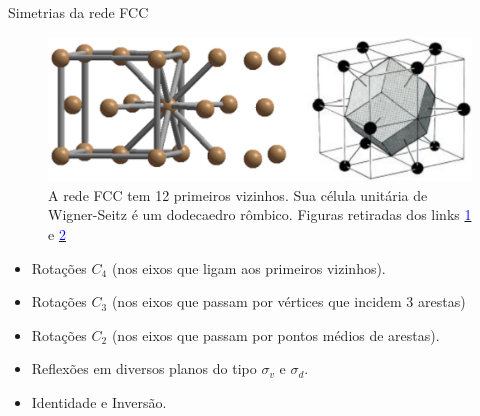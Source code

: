 \documentclass[aspectratio=169]{beamer}
\begin{document}


\begin{frame}{Simetrias da rede FCC}

\begin{figure}[H]
\centering
\includegraphics[width=0.7\linewidth]{fig/fcc_wignerseitz.png}
\caption{A rede FCC tem 12 primeiros vizinhos. Sua célula unitária de Wigner-Seitz é um dodecaedro rômbico. Figuras retiradas dos links \href{https://www.toppr.com/ask/question/the-coordination-number-of-an-atom-in-a-fcc-lattice-is/}{\textcolor{blue}{1}} e \href{https://www.chegg.com/homework-help/questions-and-answers/problem-1-7-points-bcc-fcc-lattices-others-reciprocal-latices-means-example-x-ray-diffract-q35699379}{\textcolor{blue}{2}}}
\label{fig:fcc_wignerseitz}
\end{figure}

\begin{itemize}
\item Rotações $C_4$ (nos eixos que ligam aos primeiros vizinhos).
\item Rotações $C_3$ (nos eixos que passam por vértices que incidem 3 arestas)
\item Rotações $C_2$ (nos eixos que passam por pontos médios de arestas).
\item Reflexões em diversos planos do tipo $\sigma_v$ e $\sigma_d$.
\item Identidade e Inversão.
\end{itemize}

\end{frame}


\end{document}
